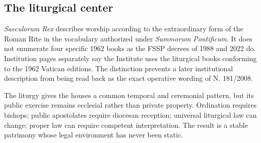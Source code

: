 \subsection{The liturgical center}

\emph{Saeculorum Rex} describes worship according to the extraordinary form of the Roman Rite in the vocabulary authorized under \emph{Summorum Pontificum}. It does not enumerate four specific 1962 books as the FSSP decrees of 1988 and 2022 do. Institution pages separately say the Institute uses the liturgical books conforming to the 1962 Vatican editions. The distinction prevents a later institutional description from being read back as the exact operative wording of N. 181/2008.

The liturgy gives the houses a common temporal and ceremonial pattern, but its public exercise remains ecclesial rather than private property. Ordination requires bishops; public apostolates require diocesan reception; universal liturgical law can change; proper law can require competent interpretation. The result is a stable patrimony whose legal environment has never been static.

